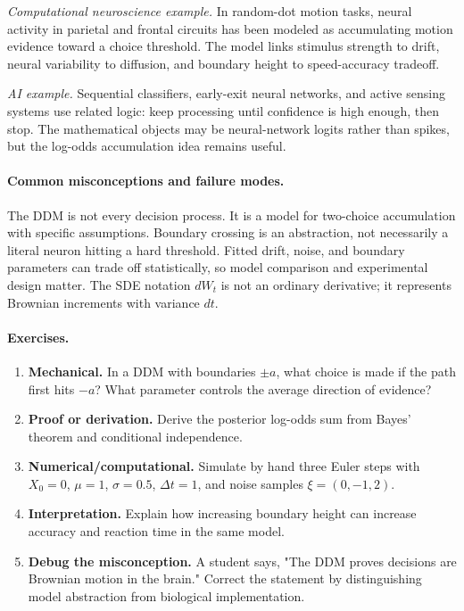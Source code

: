 \emph{Computational neuroscience example.}
In random-dot motion tasks, neural activity in parietal and frontal circuits has been modeled as accumulating motion evidence toward a choice threshold. The model links stimulus strength to drift, neural variability to diffusion, and boundary height to speed-accuracy tradeoff.

\emph{AI example.}
Sequential classifiers, early-exit neural networks, and active sensing systems use related logic: keep processing until confidence is high enough, then stop. The mathematical objects may be neural-network logits rather than spikes, but the log-odds accumulation idea remains useful.

\paragraph{Common misconceptions and failure modes.}
The DDM is not every decision process. It is a model for two-choice accumulation with specific assumptions. Boundary crossing is an abstraction, not necessarily a literal neuron hitting a hard threshold. Fitted drift, noise, and boundary parameters can trade off statistically, so model comparison and experimental design matter. The SDE notation \(dW_t\) is not an ordinary derivative; it represents Brownian increments with variance \(dt\).

\paragraph{Exercises.}
\begin{enumerate}[label=\textbf{50.1.\arabic*.}, leftmargin=*]
\item \textbf{Mechanical.} In a DDM with boundaries \(\pm a\), what choice is made if the path first hits \(-a\)? What parameter controls the average direction of evidence?
\item \textbf{Proof or derivation.} Derive the posterior log-odds sum from Bayes' theorem and conditional independence.
\item \textbf{Numerical/computational.} Simulate by hand three Euler steps with \(X_0=0\), \(\mu=1\), \(\sigma=0.5\), \(\Delta t=1\), and noise samples \(\xi=(0,-1,2)\).
\item \textbf{Interpretation.} Explain how increasing boundary height can increase accuracy and reaction time in the same model.
\item \textbf{Debug the misconception.} A student says, "The DDM proves decisions are Brownian motion in the brain." Correct the statement by distinguishing model abstraction from biological implementation.
\end{enumerate}

